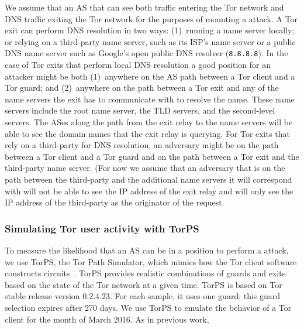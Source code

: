We assume that an AS that can see both traffic entering the Tor network 
and DNS traffic exiting the Tor network for the purposes of mounting
a \name attack. 
A Tor exit can perform DNS resolution in two ways: (1)~running a name server
locally; or relying on a third-party name server, such as its ISP's name
server or a public DNS name server such as Google's open public DNS
resolver ({\tt 8.8.8.8}).  In the case of Tor
exits that perform local DNS resolution a good position for an attacker
might be both (1)~anywhere on the AS path between a Tor client and a Tor
guard; and (2)~anywhere on the path between a Tor exit and any of the
name servers the exit has to communicate with to resolve the name.
These name servers include the root name server, the TLD servers, and
the second-level servers.  The ASes along the path from the exit relay
to the name servers will be able to see the domain names that the exit
relay is querying.
For Tor exits that rely on a third-party for DNS resolution, an
adversary might be on the path between a Tor client and a
Tor guard and on the path between a Tor exit and the third-party name
server.  (For now we assume that an adversary that is on the path between 
the third-party and the additional name servers it will correspond with 
will not be able to see the IP address of the exit relay and will only see 
the IP address of the third-party as the originator of the request.

\subsubsection{Simulating Tor user activity with TorPS}

To measure the likelihood that an AS can be in a position to perform a
\name attack, we use TorPS, the Tor Path Simulator, which mimics how the
Tor client software constructs circuits~\cite{TorPS}.  TorPS provides realistic
combinations of guards and exits based on the state of the Tor network
at a given time. TorPS is based on Tor stable release version 0.2.4.23. 
For each sample, 
it uses one guard; this guard selection expires after 270 days. We use TorPS to emulate
the behavior of a Tor client for the month of March 2016.  As in
previous work, 

